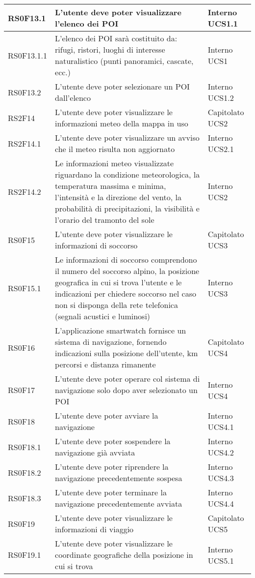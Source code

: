 \begin{center}
\begin{longtable}{|l|p{7cm}|p{1.7cm}|}
RS0F13.1	& L'utente deve poter visualizzare l'elenco dei POI & Interno UCS1.1 \\\hline
RS0F13.1.1	& L'elenco dei POI sarà costituito da: rifugi, ristori, luoghi di interesse naturalistico (punti panoramici, cascate, ecc.) & Interno UCS1 \\\hline
RS0F13.2	& L'utente deve poter selezionare un POI dall'elenco & Interno UCS1.2 \\\hline
RS2F14		& L'utente deve poter visualizzare le informazioni meteo della mappa in uso & Capitolato UCS2 \\\hline
RS2F14.1	& L'utente deve poter visualizzare un avviso che il meteo risulta non aggiornato & Interno UCS2.1 \\\hline
RS2F14.2	& Le informazioni meteo visualizzate riguardano la condizione meteorologica, la temperatura massima e minima, l'intensità e la direzione del vento, la probabilità di precipitazioni, la visibilità e l'orario del tramonto del sole & Interno UCS2 \\\hline
RS0F15		& L'utente deve poter visualizzare le informazioni di soccorso & Capitolato UCS3 \\\hline
RS0F15.1	& Le informazioni di soccorso comprendono il numero del soccorso alpino, la posizione geografica in cui si trova l'utente e le indicazioni per chiedere soccorso nel caso non si disponga della rete telefonica (segnali acustici e luminosi) & Interno UCS3 \\\hline
RS0F16		& L'applicazione smartwatch fornisce un sistema di navigazione, fornendo indicazioni sulla posizione dell’utente, km percorsi e distanza rimanente & Capitolato UCS4 \\\hline
RS0F17		& L'utente deve poter operare col sistema di navigazione solo dopo aver selezionato un POI & Interno UCS4 \\\hline
RS0F18		& L'utente deve poter avviare la navigazione & Interno UCS4.1 \\\hline
RS0F18.1	& L'utente deve poter sospendere la navigazione già avviata & Interno UCS4.2 \\\hline
RS0F18.2	& L'utente deve poter riprendere la navigazione precedentemente sospesa & Interno UCS4.3 \\\hline
RS0F18.3	& L'utente deve poter terminare la navigazione precedentemente avviata & Interno UCS4.4 \\\hline
RS0F19		& L'utente deve poter visualizzare le informazioni di viaggio & Capitolato UCS5 \\\hline
RS0F19.1	& L'utente deve poter visualizzare le coordinate geografiche della posizione in cui si trova & Interno UCS5.1 \\\hline

\end{longtable}
\end{center}
